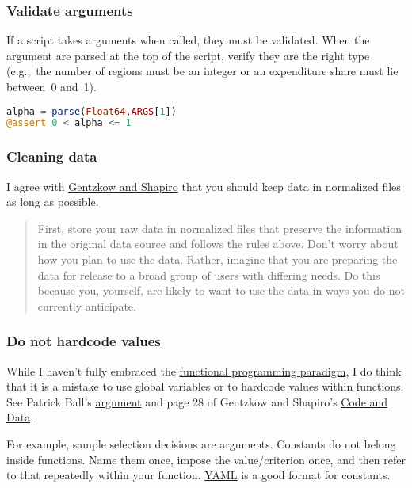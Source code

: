 \subsubsection{Validate arguments}

If a script takes arguments when called, they must be validated.
When the argument are parsed at the top of the script,
verify they are the right type (e.g.,~the number of regions must be an integer or an expenditure share must lie between~0 and~1).
\begin{lstlisting}[language=julia]
alpha = parse(Float64,ARGS[1])
@assert 0 < alpha <= 1
\end{lstlisting}

\subsubsection{Cleaning data}

I agree with \href{https://web.stanford.edu/~gentzkow/research/CodeAndData.xhtml}{Gentzkow and Shapiro}
that you should keep data in normalized files as long as possible.
\begin{quote}
First, store your raw data in normalized files that preserve the information in the original data source and follows the rules above.
Don't worry about how you plan to use the data.
Rather, imagine that you are preparing the data for release to a broad group of users with differing needs.
Do this because you, yourself, are likely to want to use the data in ways you do not currently anticipate.
\end{quote}

\subsubsection{Do not hardcode values}

While I haven't fully embraced the \href{https://en.wikipedia.org/wiki/Functional_programming}{functional programming paradigm},
I do think that it is a mistake to use global variables or to hardcode values within functions.
See 
Patrick Ball's \href{https://www.youtube.com/watch?v=ZSunU9GQdcI&t=36m43s}{argument} 
and
page 28 of Gentzkow and Shapiro's \href{https://web.stanford.edu/~gentzkow/research/CodeAndData.pdf}{Code and Data}.

For example, sample selection decisions are arguments.
Constants do not belong inside functions.
Name them once, impose the value/criterion once, and then refer to that repeatedly within your function.
\href{http://yaml.org/}{YAML} is a good format for constants.

